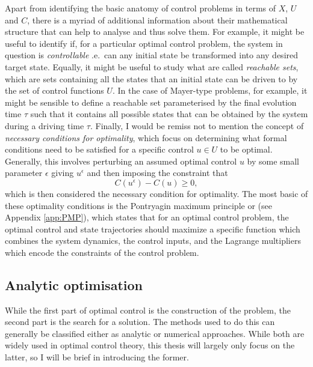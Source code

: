 Apart from identifying the basic anatomy of control problems in terms of $X$, $U$ and $C$, there is a myriad of additional information about their mathematical structure that can help to analyse and thus solve them. For example, it might be useful to identify if, for a particular optimal control problem, the system in question is \emph{controllable}\cite{dirr_lie_2008, fleming_optimal_1975} \@i.e.~can any initial state be transformed into any desired target state. Equally, it might be useful to study what are called \emph{reachable sets}\cite{vom_ende_reachability_2020, fleming_optimal_1975}, which are sets containing all the states that an initial state can be driven to by the set of control functions $U$. In the case of Mayer-type problems, for example, it might be sensible to define a reachable set parameterised by the final evolution time $\tau$ such that it contains all possible states that can be obtained by the system during a driving time $\tau$. Finally, I would be remiss not to mention the concept of \emph{necessary conditions for optimality}\cite{mangasarian_sufficient_1966}, which focus on determining what formal conditions need to be satisfied for a specific control $u \in U$ to be optimal. Generally, this involves perturbing an assumed optimal control $u$ by some small parameter $\epsilon$ giving $u^{\epsilon}$ and then imposing the constraint that
\begin{equation}\label{eq:optimality_condition}
    C(u^{\epsilon}) - C(u) \geq 0,
\end{equation}
which is then considered the necessary condition for optimality. The most basic of these optimality conditions is the Pontryagin maximum principle or  \cite{boltyanski_nonclassical_1999} (see Appendix \ref{app:PMP}), which states that for an optimal control problem, the optimal control and state trajectories should maximize a specific function which combines the system dynamics, the control inputs, and the Lagrange multipliers which encode the constraints of the control problem.

\subsection{Analytic optimisation}\label{sec:3.1.2_analytic_optimisation}

While the first part of optimal control is the construction of the problem, the second part is the search for a solution. The methods used to do this can generally be classified either as analytic or numerical approaches. While both are widely used in optimal control theory, this thesis will largely only focus on the latter, so I will be brief in introducing the former. 

